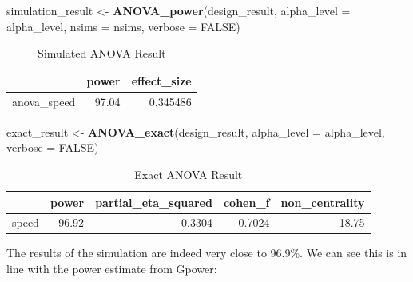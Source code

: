 \documentclass[]{book}
\newenvironment{Shaded}{\begin{snugshade}}{\end{snugshade}}
\newcommand{\DataTypeTok}[1]{\textcolor[rgb]{0.13,0.29,0.53}{#1}}
\newcommand{\KeywordTok}[1]{\textcolor[rgb]{0.13,0.29,0.53}{\textbf{#1}}}
\newcommand{\NormalTok}[1]{#1}
\newcommand{\OtherTok}[1]{\textcolor[rgb]{0.56,0.35,0.01}{#1}}
\newcommand{\StringTok}[1]{\textcolor[rgb]{0.31,0.60,0.02}{#1}}
\begin{document}
\begin{Shaded}
\begin{Highlighting}[]
\NormalTok{simulation_result <-}\StringTok{ }\KeywordTok{ANOVA_power}\NormalTok{(design_result, }
                                 \DataTypeTok{alpha_level =}\NormalTok{ alpha_level, }
                                 \DataTypeTok{nsims =}\NormalTok{ nsims,}
                                 \DataTypeTok{verbose =} \OtherTok{FALSE}\NormalTok{)}
\end{Highlighting}
\end{Shaded}

\begin{table}[t]

\caption{\label{tab:unnamed-chunk-109}Simulated ANOVA Result}
\centering
\begin{tabular}{l|r|r}
\hline
  & power & effect\_size\\
\hline
anova\_speed & 97.04 & 0.345486\\
\hline
\end{tabular}
\end{table}

\begin{Shaded}
\begin{Highlighting}[]
\NormalTok{exact_result <-}\StringTok{ }\KeywordTok{ANOVA_exact}\NormalTok{(design_result,}
                            \DataTypeTok{alpha_level =}\NormalTok{ alpha_level,}
                            \DataTypeTok{verbose =} \OtherTok{FALSE}\NormalTok{)}
\end{Highlighting}
\end{Shaded}

\begin{table}[t]

\caption{\label{tab:unnamed-chunk-111}Exact ANOVA Result}
\centering
\begin{tabular}{l|r|r|r|r}
\hline
  & power & partial\_eta\_squared & cohen\_f & non\_centrality\\
\hline
speed & 96.92 & 0.3304 & 0.7024 & 18.75\\
\hline
\end{tabular}
\end{table}

The results of the simulation are indeed very close to 96.9\%. We can see this is in line with the power estimate from Gpower:
\end{document}
